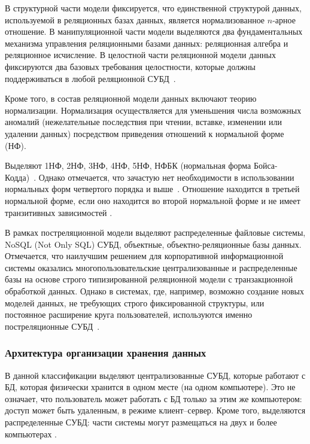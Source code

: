 В структурной части модели фиксируется, что единственной структурой данных, используемой в реляционных базах данных, является
нормализованное $n$-арное отношение.
В манипуляционной части модели выделяются два фундаментальных механизма управления реляционными базами данных: 
реляционная алгебра и реляционное исчисление.
В целостной части реляционной модели данных фиксируются два
базовых требования целостности, которые должны поддерживаться в
любой реляционной СУБД~\cite{avrunev-db-models-2018}. 

Кроме того, в состав реляционной модели данных включают теорию нормализации. 
Нормализация осуществляется для уменьшения числа возможных аномалий (нежелательные последствия при чтении, вставке, изменении или удалении данных) посредством приведения отношений к нормальной форме (НФ). 

Выделяют 1НФ, 2НФ, 3НФ, 4НФ, 5НФ, НФБК (нормальная форма Бойса-Кодда)~\cite{krenke-db-design-2005}. 
Однако отмечается, что зачастую нет необходимости в использовании нормальных форм четвертого порядка и выше~\cite{shilin-NF-2016}.  
Отношение находится в третьей нормальной форме, если оно находится во второй нормальной форме и не имеет транзитивных зависимостей \cite{krenke-db-design-2005}.

В рамках постреляционной модели выделяют распределенные файловые системы, NoSQL (Not Only SQL) СУБД, объектные, объектно-реляционные базы данных. 
Отмечается, что наилучшим решением для корпоративной информационной системы оказались многопользовательские централизованные и распределенные базы на основе строго типизированной реляционной модели с транзакционной обработкой данных. 
Однако в системах, где, например, возможно создание новых моделей данных, не требующих строго фиксированной структуры, или постоянное расширение круга пользователей, используются именно постреляционные СУБД~\cite{parfenov-postrelational-db-2016}.

\subsubsection{Архитектура организации хранения данных}

В данной классификации выделяют централизованные СУБД, которые работают с БД, которая физически хранится в одном месте (на одном компьютере). 
Это не означает, что пользователь может работать с БД только за этим же компьютером: доступ может быть удаленным, в режиме клиент–сервер. 
Кроме того, выделяются распределенные СУБД: части системы могут размещаться на двух и более компьютерах \cite{karpova-db-textbook-2009}. 

